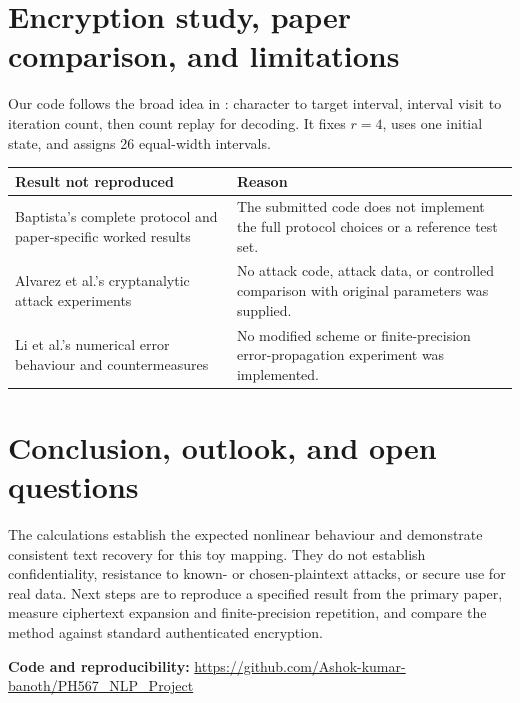 \documentclass[9pt]{article}
\begin{document}
\section{Encryption study, paper comparison, and limitations}
Our code follows the broad idea in \citet{Baptista1998}: character to target
interval, interval visit to iteration count, then count replay for decoding.
It fixes $r=4$, uses one initial state, and assigns 26 equal-width intervals.
\begin{center}\small\begin{tabularx}{\linewidth}{p{.38\linewidth}X}\toprule
\textbf{Result not reproduced} & \textbf{Reason}\\\midrule
Baptista's complete protocol and paper-specific worked results & The submitted code does not implement the full protocol choices or a reference test set.\\
Alvarez et al.'s cryptanalytic attack experiments & No attack code, attack data, or controlled comparison with original parameters was supplied.\\
Li et al.'s numerical error behaviour and countermeasures & No modified scheme or finite-precision error-propagation experiment was implemented.\\\bottomrule
\end{tabularx}\end{center}
\section{Conclusion, outlook, and open questions}
The calculations establish the expected nonlinear behaviour and demonstrate
consistent text recovery for this toy mapping. They do not establish
confidentiality, resistance to known- or chosen-plaintext attacks, or secure
use for real data. Next steps are to reproduce a specified result from the
primary paper, measure ciphertext expansion and finite-precision repetition,
and compare the method against standard authenticated encryption.

\noindent\textbf{Code and reproducibility:}\newline
\url{https://github.com/Ashok-kumar-banoth/PH567_NLP_Project}
\clearpage

\end{document}
